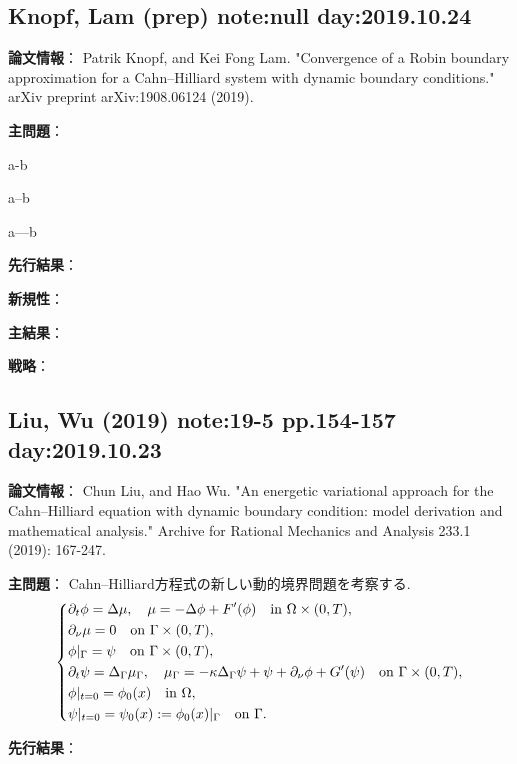 \documentclass[a4paper]{jsarticle}
\begin{document}
\subsection{Knopf, Lam (prep) note:null day:2019.10.24}
{\bf 論文情報}：
Patrik Knopf, and Kei Fong Lam. "Convergence of a Robin boundary approximation for a Cahn--Hilliard system with dynamic boundary conditions." arXiv preprint arXiv:1908.06124 (2019).

{\bf 主問題}：

a-b

a--b

a---b

{\bf 先行結果}：

{\bf 新規性}：

{\bf 主結果}：

{\bf 戦略}：


\newpage

\subsection{Liu, Wu (2019) \cite{LiuWu2019} note:19-5 pp.154-157 day:2019.10.23}
{\bf 論文情報}：
Chun Liu, and Hao Wu. "An energetic variational approach for the Cahn–Hilliard equation with dynamic boundary condition: model derivation and mathematical analysis." Archive for Rational Mechanics and Analysis 233.1 (2019): 167-247.

{\bf 主問題}：
Cahn--Hilliard方程式の新しい動的境界問題を考察する.
\begin{equation}\left\{\begin{aligned}
	&\partial_t\phi = \Delta\mu,\quad \mu = -\Delta\phi + F'(\phi) \quad \text{in }\Omega\times(0,T),\\
	&\partial_{\nu}\mu = 0 \quad \text{on }\Gamma\times(0,T),\\
	&\phi|_{\Gamma} = \psi \quad \text{on }\Gamma\times(0,T),\\
	&\partial_t\psi = \Delta_{\Gamma}\mu_{\Gamma},\quad \mu_{\Gamma} = -\kappa\Delta_{\Gamma}\psi + \psi + \partial_{\nu}\phi + G'(\psi) \quad \text{on }\Gamma\times(0,T),\\
	&\phi|_{t=0} = \phi_0(x) \quad \text{in }\Omega,\\
	&\psi|_{t=0} = \psi_0(x) := \phi_0(x)|_{\Gamma} \quad \text{on }\Gamma.
\end{aligned}\right.\end{equation}

{\bf 先行結果}：
\end{document}
